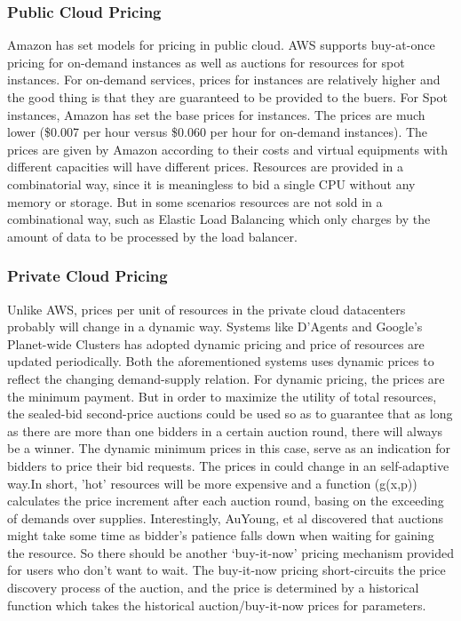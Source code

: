 \documentclass[11pt]{article}
\begin{document}
\subsubsection{Public Cloud Pricing}
Amazon\cite{aws} has set models for pricing in public cloud. AWS supports buy-at-once pricing for on-demand instances as well as auctions for resources
for spot instances. For on-demand services, prices for instances are relatively higher and the good thing is that they are guaranteed to be provided to the buers.
For Spot instances\cite{spot}, Amazon has set the base prices for instances. The prices are much lower (\$0.007 per hour versus \$0.060 per hour for on-demand instances).
The prices are given by Amazon according to their costs and virtual equipments with different capacities will have different prices. Resources
are provided in a combinatorial way, since it is meaningless to bid a single CPU without any memory or storage. But in some scenarios resources are not 
sold in a combinational way, such as Elastic Load Balancing which only charges by the amount of data to be processed by the load balancer.
\subsubsection{Private Cloud Pricing}
Unlike AWS, prices per unit of resources in the private cloud datacenters probably will change in a dynamic way.  Systems like D'Agents\cite{dartmouth} and Google's Planet-wide 
Clusters\cite{google} has adopted dynamic pricing and price of resources are updated periodically. Both the aforementioned systems uses dynamic prices to 
reflect the changing demand-supply relation. For dynamic pricing, the prices are the minimum payment. But in order to maximize the utility of total resources,
the sealed-bid second-price auctions \cite{second price} could be used so as to guarantee that as long as there are more than one bidders in a certain auction round, 
there will always be a winner. The dynamic minimum prices in this case, serve as an indication for bidders to price their bid requests. The prices in \cite{google} could 
change in an self-adaptive way.In short, 'hot' resources will be more expensive and a function (g(x,p)) calculates the price increment after each auction round, basing on the 
exceeding of demands over supplies. Interestingly, AuYoung, et al \cite{ucsd} discovered that auctions might take some time as bidder's patience falls down
when waiting for gaining the resource. So there should be another `buy-it-now' pricing mechanism provided for users who don't want to wait. The buy-it-now
pricing short-circuits the price discovery process of the auction, and the price is determined by a historical function which takes the historical auction/buy-it-now
prices for parameters.
\end{document}
